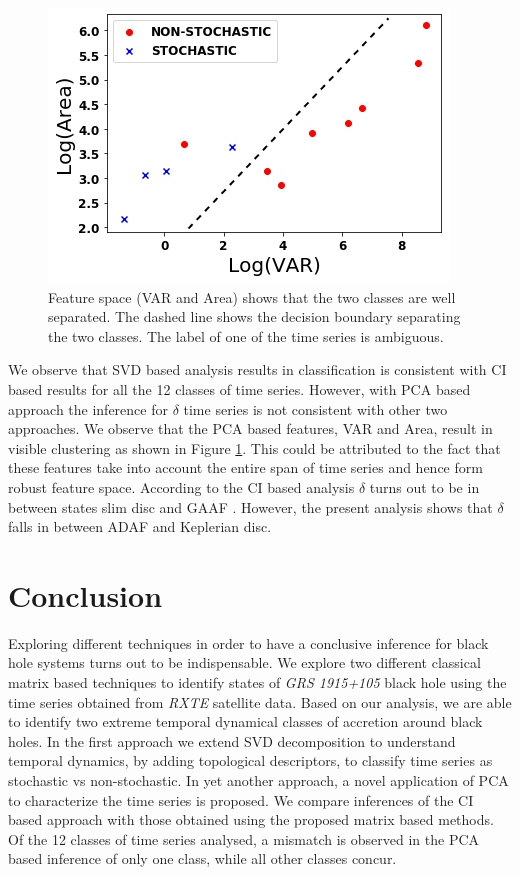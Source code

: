 \documentclass[10pt,conference]{IEEEtran}
\begin{document}
\begin{figure}
  \centering
  \includegraphics[width=.9\linewidth]{variance_area.drawio.png}
  \caption{Feature space (VAR and Area) shows that the two classes are well separated. The dashed line shows the decision boundary separating the two classes. The label of one of the time series is ambiguous.}
  \label{fig:variance_area_fs}
\end{figure}
We observe that SVD based analysis results in classification  is consistent with CI based results for all the 12 classes of time series. However, with PCA based approach the inference for  $\delta$ time series is not consistent with other two approaches. We observe that the PCA based features, VAR and Area, result in visible clustering as shown in Figure \ref{fig:variance_area_fs}. This could be attributed to the fact that   these features take into account the entire span of time series and hence form robust feature space. According to the CI based analysis $\delta$ turns out to be in between states slim disc  and GAAF \cite{Adegoke2018}. However, the present analysis shows that $\delta$ falls in between ADAF and Keplerian disc.


\section{Conclusion}
Exploring different techniques in order to have a conclusive inference for black hole systems turns out to be indispensable. We explore two different classical matrix based techniques to identify states of \textit{GRS 1915+105} black hole using the time series obtained from \textit{RXTE} satellite data. Based on our analysis, we are able to identify two extreme temporal dynamical classes of accretion around black holes. In the first approach we extend  SVD decomposition to understand temporal dynamics,  by adding  topological descriptors, to classify time series as stochastic vs non-stochastic. In yet another approach, a novel application of  PCA  to characterize the time series is proposed. We compare inferences of the CI based approach with those obtained using the proposed matrix based methods. Of the 12 classes of time series analysed, a mismatch is observed in the PCA based inference of only one class, while all other classes concur.
\end{document}
